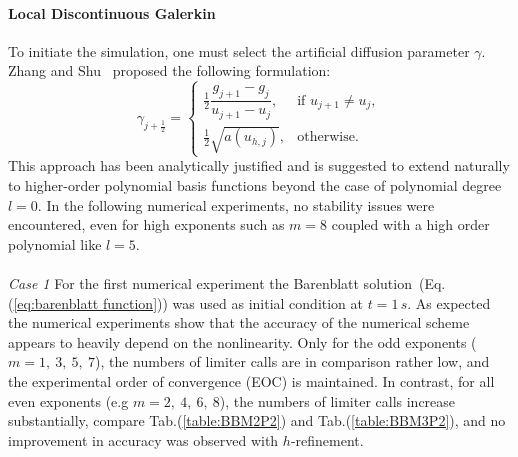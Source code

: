 \documentclass[a4paper,12pt]{paper}
\begin{document}
\paragraph{Local Discontinuous Galerkin}  
To initiate the simulation, one must select the artificial diffusion parameter \(\gamma\). Zhang and Shu~\cite{Zhang2009} proposed the following formulation:
\[
\gamma_{j+\frac{1}{2}} =
\begin{cases}
	\frac{1}{2} \dfrac{g_{j+1} - g_j}{u_{j+1} - u_j}, & \text{if } u_{j+1} \neq u_j, \\[10pt]
	\frac{1}{2} \sqrt{a(u_{h,j})}, & \text{otherwise}.
\end{cases}
\]
This approach has been analytically justified and is suggested to extend naturally to higher-order polynomial basis functions beyond the case of polynomial degree \(l=0\). In the following numerical experiments, no stability issues were encountered, even for high exponents such as \(m=8\) coupled with a high order polynomial like $l=5$.\\
\\
\textit{Case 1 } For the first numerical experiment the Barenblatt solution~(Eq.(\ref{eq:barenblatt function})) was used as initial condition at \(t=1\,s\). As expected the numerical experiments show that the accuracy of the numerical scheme appears to heavily depend on the nonlinearity.
Only for the odd exponents (\(m=1,~3,~5,~7\)), the numbers of limiter calls are in comparison rather low, and the experimental order of convergence (EOC) is maintained.
In contrast, for all even exponents (e.g $m=2,~4,~6,~8$), the numbers of limiter calls increase substantially, compare Tab.(\ref{table:BBM2P2}) and Tab.(\ref{table:BBM3P2}), and no improvement in accuracy was observed with \(h\)-refinement.
\begin{table}[h]
		\centering
		\caption{Error calculation results for $l=2,~m=8$ for the Barenblatt function at $t=1s$ as initial data and the end time $t=1.05s$}
		\label{table:BBM8P2}
\end{table}
\end{document}
